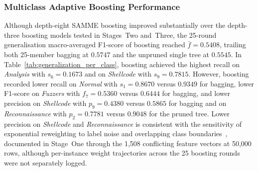 \subsubsection{Multiclass Adaptive Boosting Performance}
Although depth-eight SAMME boosting improved substantially over the depth-three boosting models tested in Stages~Two and~Three, the 25-round generalisation macro-averaged F1-score of boosting reached $\bar{f} = 0.5408$, trailing both 25-member bagging at $0.5747$ and the unpruned single tree at $0.5545$. In Table~\ref{tab:generalization_per_class}, boosting achieved the highest recall on \emph{Analysis} with $s_6 = 0.1673$ and on \emph{Shellcode} with $s_9 = 0.7815$. However, boosting recorded lower recall on \emph{Normal} with $s_1 = 0.8670$ versus $0.9349$ for bagging, lower F1-score on \emph{Fuzzers} with $f_7 = 0.5360$ versus $0.6444$ for bagging, and lower precision on \emph{Shellcode} with $p_9 = 0.4380$ versus $0.5865$ for bagging and on \emph{Reconnaissance} with $p_2 = 0.7781$ versus $0.9048$ for the pruned tree. Lower precision on \emph{Shellcode} and \emph{Reconnaissance} is consistent with the sensitivity of exponential reweighting to label noise and overlapping class boundaries~\cite{Kelleher2020}, documented in Stage~One through the 1,508 conflicting feature vectors at 50,000 rows, although per-instance weight trajectories across the 25 boosting rounds were not separately logged.

